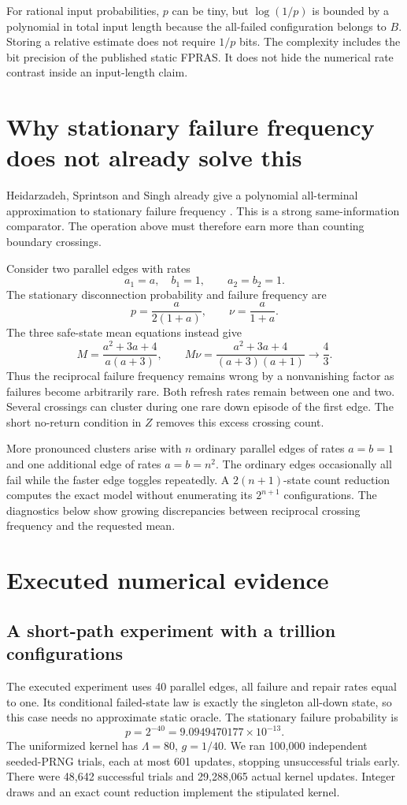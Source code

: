 \documentclass[11pt,a4paper]{article}
\begin{document}
For rational input probabilities, $p$ can be tiny, but $\log(1/p)$ is bounded by a polynomial in total input length because the all-failed configuration belongs to $B$. Storing a relative estimate does not require $1/p$ bits. The complexity includes the bit precision of the published static FPRAS. It does not hide the numerical rate contrast inside an input-length claim.

\section{Why stationary failure frequency does not already solve this}
Heidarzadeh, Sprintson and Singh already give a polynomial all-terminal approximation to stationary failure frequency \cite{frequency}. This is a strong same-information comparator. The operation above must therefore earn more than counting boundary crossings.

Consider two parallel edges with rates
\[
 a_1=a,\quad b_1=1,\qquad a_2=b_2=1.
\]
The stationary disconnection probability and failure frequency are
\[
 p=\frac{a}{2(1+a)},\qquad \nu=\frac{a}{1+a}.
\]
The three safe-state mean equations instead give
\[
 M=\frac{a^2+3a+4}{a(a+3)},\qquad
 M\nu=\frac{a^2+3a+4}{(a+3)(a+1)}\longrightarrow\frac43.
\]
Thus the reciprocal failure frequency remains wrong by a nonvanishing factor as failures become arbitrarily rare. Both refresh rates remain between one and two. Several crossings can cluster during one rare down episode of the first edge. The short no-return condition in $Z$ removes this excess crossing count.

More pronounced clusters arise with $n$ ordinary parallel edges of rates $a=b=1$ and one additional edge of rates $a=b=n^2$. The ordinary edges occasionally all fail while the faster edge toggles repeatedly. A $2(n+1)$-state count reduction computes the exact model without enumerating its $2^{n+1}$ configurations. The diagnostics below show growing discrepancies between reciprocal crossing frequency and the requested mean.

\section{Executed numerical evidence}
\subsection{A short-path experiment with a trillion configurations}
The executed experiment uses 40 parallel edges, all failure and repair rates equal to one. Its conditional failed-state law is exactly the singleton all-down state, so this case needs no approximate static oracle. The stationary failure probability is
\[
 p=2^{-40}=9.0949470177\times10^{-13}.
\]
The uniformized kernel has $\Lambda=80$, $g=1/40$. We ran 100,000 independent seeded-PRNG trials, each at most 601 updates, stopping unsuccessful trials early. There were 48,642 successful trials and 29,288,065 actual kernel updates. Integer draws and an exact count reduction implement the stipulated kernel.
\end{document}
